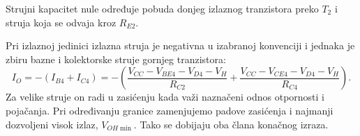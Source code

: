 Strujni kapacitet nule određuje pobuda donjeg izlaznog tranzistora preko $T_2$ i struja koja se odvaja kroz $R_{E2}$.

Pri izlaznoj jedinici izlazna struja je negativna u izabranoj konvenciji i jednaka je zbiru bazne i kolektorske struje gornjeg tranzistora:
\[I_O=-(I_{B4}+I_{C4})=-\left(\frac{V_{CC}-V_{BE4}-V_{D4}-V_H}{R_{C2}}+\frac{V_{CC}-V_{CE4}-V_{D4}-V_H}{R_{C4}}\right).\]
Za velike struje on radi u zasićenju kada važi naznačeni odnos otpornosti i pojačanja. Pri određivanju granice zamenjujemo padove zasićenja i najmanji dozvoljeni visok izlaz, $V_{OH\min}$. Tako se dobijaju oba člana konačnog izraza.
